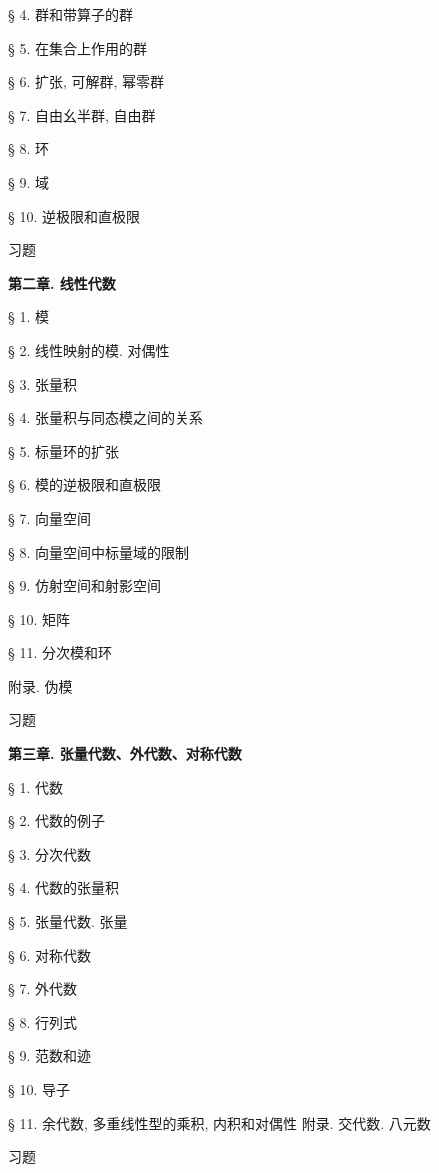 § 4. 群和带算子的群

§ 5. 在集合上作用的群

§ 6. 扩张, 可解群, 幂零群

§ 7. 自由幺半群, 自由群

§ 8. 环

§ 9. 域

§ 10. 逆极限和直极限

习题

\textbf{第二章. 线性代数}

§ 1. 模

§ 2. 线性映射的模. 对偶性

§ 3. 张量积

§ 4. 张量积与同态模之间的关系

§ 5. 标量环的扩张

§ 6. 模的逆极限和直极限

§ 7. 向量空间

§ 8. 向量空间中标量域的限制

§ 9. 仿射空间和射影空间

§ 10. 矩阵

§ 11. 分次模和环

附录. 伪模

习题

\textbf{第三章. 张量代数、外代数、对称代数}

§ 1. 代数

§ 2. 代数的例子

§ 3. 分次代数

§ 4. 代数的张量积

§ 5. 张量代数. 张量

§ 6. 对称代数

§ 7. 外代数

§ 8. 行列式

§ 9. 范数和迹

§ 10. 导子

§ 11. 余代数, 多重线性型的乘积, 内积和对偶性 附录. 交代数. 八元数

习题
